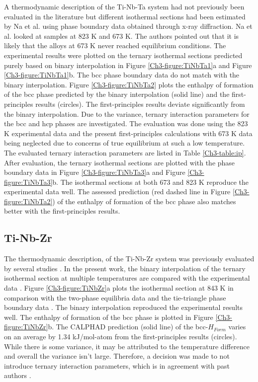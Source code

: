 A thermodynamic description of the Ti-Nb-Ta system had not previously been evaluated in the literature but different isothermal sections had been estimated by Na et al. \cite{Na2001} using phase boundary data obtained through x-ray diffraction. Na et al. \cite{Na2001} looked at samples at 823 K and 673 K. The authors \cite{Na2001} pointed out that it is likely that the alloys at 673 K never reached equilibrium conditions. The experimental results \cite{Na2001} were plotted on the ternary isothermal sections predicted purely based on binary interpolation in Figure \ref{Ch3-figure:TiNbTa1}a and Figure \ref{Ch3-figure:TiNbTa1}b. The bcc phase boundary data do not match with the binary interpolation. Figure \ref{Ch3-figure:TiNbTa2} plots the enthalpy of formation of the bcc phase predicted by the binary interpolation (solid line) and the first-principles results (circles). The first-principles results deviate significantly from the binary interpolation. Due to the variance, ternary interaction parameters for the bcc and hcp phases are investigated. The evaluation was done using the 823 K experimental data and the present first-principles calculations with 673 K data being neglected due to concerns of true equilibrium at such a low temperature. The evaluated ternary interaction parameters are listed in Table \ref{Ch3-table:ip}. After evaluation, the ternary isothermal sections are plotted with the phase boundary data in Figure \ref{Ch3-figure:TiNbTa3}a and Figure \ref{Ch3-figure:TiNbTa3}b. The isothermal sections at both 673 and 823 K reproduce the experimental data \cite{Na2001} well. The assessed prediction (red dashed line in Figure \ref{Ch3-figure:TiNbTa2}) of the enthalpy of formation of the bcc phase also matches better with the first-principles results.

\subsection{Ti-Nb-Zr}

The thermodynamic description, of the Ti-Nb-Zr system was previously evaluated by several studies \cite{Kumar1994a,Tokunaga2007}. In the present work, the binary interpolation of the ternary isothermal section at multiple temperatures are compared with the experimental data \cite{Kumar1994a,Tokunaga2007}. Figure \ref{Ch3-figure:TiNbZr}a plots the isothermal section at 843 K in comparison with the two-phase equilibria data and the tie-triangle phase boundary data \cite{Tokunaga2007}. The binary interpolation reproduced the experimental results well. The enthalpy of formation of the bcc phase is plotted in Figure \ref{Ch3-figure:TiNbZr}b. The CALPHAD prediction (solid line) of the bcc-$H_{Form}$ varies on an average by 1.34 kJ/mol-atom from the first-principles results (circles). While there is some variance, it may be attributed to the temperature difference and overall the variance isn't large. Therefore, a decision was made to not introduce ternary interaction parameters, which is in agreement with past authors \cite{Kumar1994a,Tokunaga2007}.  

